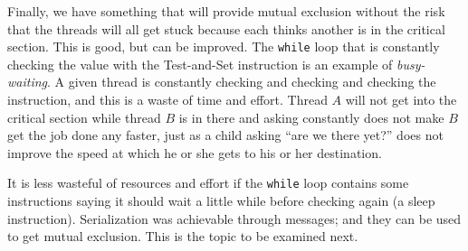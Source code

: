 Finally, we have something that will provide mutual exclusion without the risk that the threads will all get stuck because each thinks another is in the critical section. This is good, but can be improved. The \texttt{while} loop that is constantly checking the value with the Test-and-Set instruction is an example of \textit{busy-waiting}. A given thread is constantly checking and checking and checking the instruction, and this is a waste of time and effort. Thread $A$ will not get into the critical section while thread $B$ is in there and asking constantly does not make $B$ get the job done any faster, just as a child asking ``are we there yet?'' does not improve the speed at which he or she gets to his or her destination.

It is less wasteful of resources and effort if the \texttt{while} loop contains some instructions saying it should wait a little while before checking again (a sleep instruction). Serialization was achievable through messages; and they can be used to get mutual exclusion. This is the topic to be examined next.





